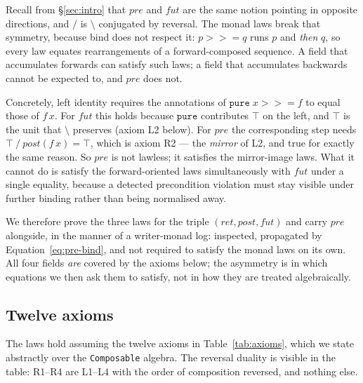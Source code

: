 \documentclass[acmsmall,screen]{acmart}
\newcommand{\pre}{\mathit{pre}}
\newcommand{\post}{\mathit{post}}
\newcommand{\fut}{\mathit{fut}}
\newcommand{\ret}{\mathit{ret}}
\newcommand{\lquot}{\mathbin{\setminus}}   %
\newcommand{\rquot}{\mathbin{/}}           %
\begin{document}
Recall from \S\ref{sec:intro} that $\pre$ and $\fut$ are the same notion
pointing in opposite directions, and $\rquot$ is $\lquot$ conjugated by
reversal.
The monad laws break that symmetry, because bind does not respect it:
$p \mathbin{>\!\!>\!\!=} q$ runs $p$ and \emph{then} $q$, so every law
equates rearrangements of a forward-composed sequence.
A field that accumulates forwards can satisfy such laws; a field that
accumulates backwards cannot be expected to, and $\pre$ does not.

Concretely, left identity requires the annotations of
$\mathtt{pure}\;x \mathbin{>\!\!>\!\!=} f$ to equal those of $f\,x$.
For $\fut$ this holds because $\mathtt{pure}$ contributes $\top$ on the
left, and $\top$ is the unit that $\lquot$ preserves (axiom L2 below).
For $\pre$ the corresponding step needs $\top \rquot \post(f\,x) = \top$,
which is axiom R2 --- the \emph{mirror} of L2, and true for exactly the
same reason.
So $\pre$ is not lawless; it satisfies the mirror-image laws.
What it cannot do is satisfy the forward-oriented laws simultaneously with
$\fut$ under a single equality, because a detected precondition violation
must stay visible under further binding rather than being normalised away.

We therefore prove the three laws for the triple $(\ret, \post, \fut)$ and
carry $\pre$ alongside, in the manner of a writer-monad log: inspected,
propagated by Equation~\eqref{eq:pre-bind}, and not required to satisfy the
monad laws on its own.
All four fields \emph{are} covered by the axioms below; the asymmetry is in
which equations we then ask them to satisfy, not in how they are treated
algebraically.

\subsection{Twelve axioms}
\label{sec:axioms}

The laws hold assuming the twelve axioms in Table~\ref{tab:axioms},
which we state abstractly over the \lstinline{Composable} algebra.
The reversal duality is visible in the table: R1--R4 are L1--L4 with the
order of composition reversed, and nothing else.
\end{document}
